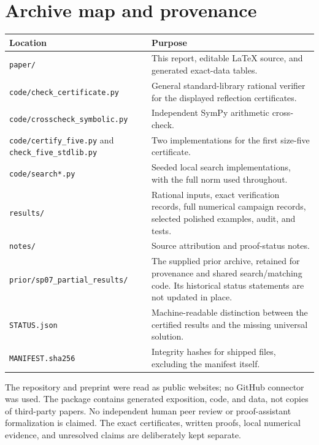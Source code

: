 \documentclass[11pt,letterpaper]{article}
\theoremstyle{remark}\newtheorem{remark}[theorem]{Remark}
\begin{document}
\section{Archive map and provenance}
\begin{center}\small
\begin{tabular}{@{}p{.31\linewidth}p{.64\linewidth}@{}}\toprule
Location & Purpose\\\midrule
\texttt{paper/} & This report, editable LaTeX source, and generated exact-data tables.\\
\texttt{code/check\_certificate.py} & General standard-library rational verifier for the displayed reflection certificates.\\
\texttt{code/crosscheck\_symbolic.py} & Independent SymPy arithmetic cross-check.\\
\texttt{code/certify\_five.py} and \texttt{check\_five\_stdlib.py} & Two implementations for the first size-five certificate.\\
\texttt{code/search*.py} & Seeded local search implementations, with the full norm used throughout.\\
\texttt{results/} & Rational inputs, exact verification records, full numerical campaign records, selected polished examples, audit, and tests.\\
\texttt{notes/} & Source attribution and proof-status notes.\\
\texttt{prior/sp07\_partial\_results/} & The supplied prior archive, retained for provenance and shared search/matching code. Its historical status statements are not updated in place.\\
\texttt{STATUS.json} & Machine-readable distinction between the certified results and the missing universal solution.\\
\texttt{MANIFEST.sha256} & Integrity hashes for shipped files, excluding the manifest itself.\\\bottomrule
\end{tabular}
\end{center}
The repository and preprint were read as public websites; no GitHub connector was used. The package contains generated exposition, code, and data, not copies of third-party papers. No independent human peer review or proof-assistant formalization is claimed. The exact certificates, written proofs, local numerical evidence, and unresolved claims are deliberately kept separate.
\end{document}
